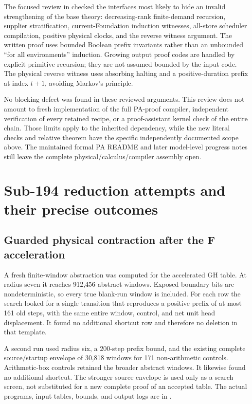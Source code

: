 \documentclass[11pt,letterpaper]{article}
\newcommand{\file}[1]{\path{#1}}
\begin{document}
The focused review in \file{research/calibration_audit.md} checked the
interfaces most likely to hide an invalid strengthening of the base
theory: decreasing-rank finite-demand recursion, supplier stratification,
current-Foundation induction witnesses, all-store scheduler compilation,
positive physical clocks, and the reverse witness argument. The written
proof uses bounded Boolean prefix invariants rather than an unbounded
``for all environments'' induction. Growing output proof codes are handled
by explicit primitive recursion; they are not assumed bounded by the
input code. The physical reverse witness uses absorbing halting and a
positive-duration prefix at index $t+1$, avoiding Markov's principle.

No blocking defect was found in these reviewed arguments. This review
does not amount to fresh implementation of the full PA-proof compiler,
independent verification of every retained recipe, or a proof-assistant
kernel check of the entire chain. Those limits apply to the inherited
dependency, while the new literal checks and relative theorem have the
specific independently documented scope above. The maintained formal PA
README and later model-level progress notes still leave the complete
physical/calculus/compiler assembly open.



\section{Sub-194 reduction attempts and their precise outcomes}
\label{sec:attempts}

\subsection{Guarded physical contraction after the F acceleration}

A fresh finite-window abstraction was computed for the accelerated GH
table. At radius seven it reaches 912,456 abstract windows. Exposed
boundary bits are nondeterministic, so every true blank-run window is
included. For each row the search looked for a single transition that
reproduces a positive prefix of at most 161 old steps, with the same
entire window, control, and net unit head displacement. It found no
additional shortcut row and therefore no deletion in that template.

A second run used radius six, a 200-step prefix bound, and the existing
complete source/startup envelope of 30,818 windows for 171 non-arithmetic
controls. Arithmetic-box controls retained the broader abstract windows.
It likewise found no additional shortcut. The stronger source envelope
is used only as a search screen, not substituted for a new complete
proof of an accepted table. The actual programs, input tables, bounds,
and output logs are in \file{research/physical/}.
\end{document}
